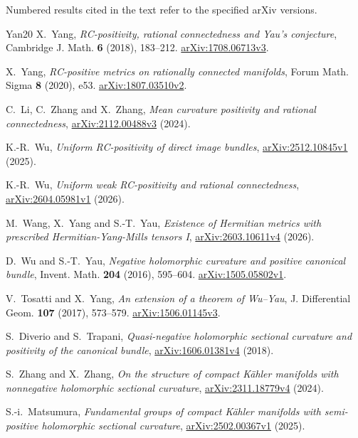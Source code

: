 \documentclass[12pt]{amsart}
\theoremstyle{definition}
\theoremstyle{remark}
\numberwithin{equation}{section}
\theoremstyle{definition}
\begin{document}
\medskip
\noindent Numbered results cited in the text refer to the specified arXiv versions.
\begin{thebibliography}{Yan20}
 X.~Yang, \emph{RC-positivity, rational connectedness and Yau's conjecture},
Cambridge J. Math. \textbf{6} (2018), 183--212.
\href{https://arxiv.org/abs/1708.06713v3}{arXiv:1708.06713v3}.

 X.~Yang, \emph{RC-positive metrics on rationally connected manifolds},
Forum Math. Sigma \textbf{8} (2020), e53.
\href{https://arxiv.org/abs/1807.03510v2}{arXiv:1807.03510v2}.

 C.~Li, C.~Zhang and X.~Zhang,
\emph{Mean curvature positivity and rational connectedness},
\href{https://arxiv.org/abs/2112.00488v3}{arXiv:2112.00488v3} (2024).

 K.-R.~Wu, \emph{Uniform RC-positivity of direct image bundles},
\href{https://arxiv.org/abs/2512.10845v1}{arXiv:2512.10845v1} (2025).

 K.-R.~Wu, \emph{Uniform weak RC-positivity and rational connectedness},
\href{https://arxiv.org/abs/2604.05981v1}{arXiv:2604.05981v1} (2026).

 M.~Wang, X.~Yang and S.-T.~Yau,
\emph{Existence of Hermitian metrics with prescribed Hermitian-Yang-Mills tensors I},
\href{https://arxiv.org/abs/2603.10611v4}{arXiv:2603.10611v4} (2026).

 D.~Wu and S.-T.~Yau,
\emph{Negative holomorphic curvature and positive canonical bundle},
Invent. Math. \textbf{204} (2016), 595--604.
\href{https://arxiv.org/abs/1505.05802v1}{arXiv:1505.05802v1}.

 V.~Tosatti and X.~Yang, \emph{An extension of a theorem of Wu--Yau},
J. Differential Geom. \textbf{107} (2017), 573--579.
\href{https://arxiv.org/abs/1506.01145v3}{arXiv:1506.01145v3}.

 S.~Diverio and S.~Trapani,
\emph{Quasi-negative holomorphic sectional curvature and positivity of the canonical bundle},
\href{https://arxiv.org/abs/1606.01381v4}{arXiv:1606.01381v4} (2018).

 S.~Zhang and X.~Zhang,
\emph{On the structure of compact K\"ahler manifolds with nonnegative holomorphic sectional curvature},
\href{https://arxiv.org/abs/2311.18779v4}{arXiv:2311.18779v4} (2024).

 S.-i.~Matsumura,
\emph{Fundamental groups of compact K\"ahler manifolds with semi-positive holomorphic sectional curvature},
\href{https://arxiv.org/abs/2502.00367v1}{arXiv:2502.00367v1} (2025).

\end{thebibliography}
\end{document}
